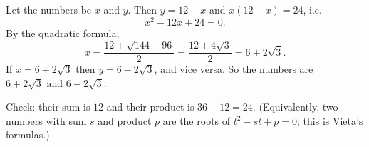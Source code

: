 Let the numbers be $x$ and $y$. Then $y=12-x$ and $x(12-x)=24$, i.e.
\[
x^2-12x+24=0 .
\]
By the quadratic formula,
\[
x=\dfrac{12\pm\sqrt{144-96}}{2}=\dfrac{12\pm4\sqrt3}{2}=6\pm2\sqrt3 .
\]
If $x=6+2\sqrt3$ then $y=6-2\sqrt3$, and vice versa. So the numbers are $\boxed{6+2\sqrt3\text{ and }6-2\sqrt3}$.

Check: their sum is $12$ and their product is $36-12=24$. (Equivalently, two numbers with sum $s$ and product $p$ are the roots of $t^2-st+p=0$; this is Vieta's formulas.)
